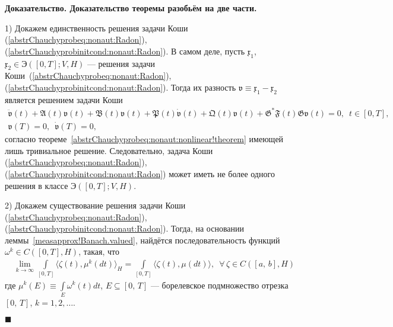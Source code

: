 \documentclass{report}
\newcounter{rem}[section]
\newcounter{theor}[section]
\newenvironment{Proof}{\par\noindent\bf Доказательство.\rm}{ $\blacksquare$\par}
\begin{document}
\begin{Proof}
Доказательство теоремы разобьём на две части.

1) Докажем единственность решения задачи Коши (\ref{abstrChauchyprobeq:nonaut:Radon}), (\ref{abstrChauchyprobinitcond:nonaut:Radon}). В самом деле, пусть $\mathfrak{x}_1$, $\mathfrak{x}_2\in{\textrm{Э}}([0,T];V,H)$ --- решения задачи Коши~(\ref{abstrChauchyprobeq:nonaut:Radon}), (\ref{abstrChauchyprobinitcond:nonaut:Radon}). Тогда их разность $\mathfrak{v}\equiv\mathfrak{x}_1-\mathfrak{x}_2$ является решением задачи Коши
\begin{gather}\label{abstrChauchyprobeq:nonaut:Radon:v}
\ddot{\mathfrak{v}}(t)+\mathfrak{A}(t){\mathfrak{v}}(t)+\mathfrak{B}(t){\mathfrak{v}}(t) + \mathfrak{P}(t)\dot{\mathfrak{v}}(t) + \mathfrak{Q}(t){\mathfrak{v}}(t)  + \mathfrak{G}^*\mathfrak{F}(t)\mathfrak{G}{\mathfrak{v}}(t) = 0,\,\,\,t\in[0,T],\\
\label{abstrChauchyprobinitcond:nonaut:Radon:v}
{\mathfrak{v}}(T)=0,\,\,\,\dot{\mathfrak{v}}(T)=0,
\end{gather}
согласно теореме~\ref{abstrChauchyprobeq:nonaut:nonlinear!theorem} имеющей лишь тривиальное решение. Следовательно, задача Коши (\ref{abstrChauchyprobeq:nonaut:Radon}), (\ref{abstrChauchyprobinitcond:nonaut:Radon}) может иметь не более одного решения в классе ${\textrm{Э}}([0,T];V,H)$.

2) Докажем существование решения задачи Коши (\ref{abstrChauchyprobeq:nonaut:Radon}), (\ref{abstrChauchyprobinitcond:nonaut:Radon}). Тогда, на основании леммы~\ref{measapprox!Banach.valued}, найдётся последовательность функций $\omega^k\in C([0,T],H)$, такая, что
\begin{gather}\label{muk.convergence}
\lim\limits_{k\to\infty}\int\limits_{[0,T]}\langle\zeta(t),\mu^k(dt)\rangle_H=\int\limits_{[0,T]}\langle\zeta(t),\mu(dt)\rangle, \,\,\,\forall\,\zeta\in C([a,\,b],H)
\end{gather}
где $\displaystyle\mu^k(E)\equiv\int\limits_E\omega^k(t)dt$, $E\subseteq [0,\,T]$ --- борелевское подмножество отрезка $[0,\,T]$, $k=1,2,\dots$.


\end{Proof}
\end{document}
